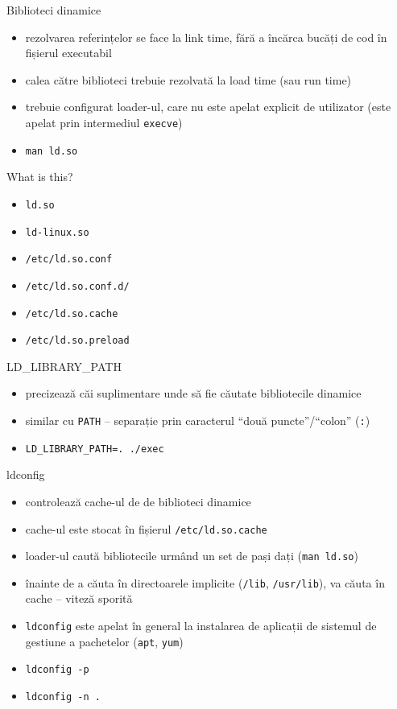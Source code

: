 \documentclass{simple}
\begin{document}
\begin{frame}{Biblioteci dinamice}
  \begin{itemize}
    \item rezolvarea referințelor se face la link time, fără a încărca bucăți
    de cod în fișierul executabil
    \item calea către biblioteci trebuie rezolvată la load time (sau run time)
    \item trebuie configurat loader-ul, care nu este apelat explicit de
    utilizator (este apelat prin intermediul \texttt{execve})
    \item \texttt{man ld.so}
  \end{itemize}
\end{frame}

\begin{frame}{What is this?}
  \begin{itemize}
    \item \texttt{ld.so}
    \item \texttt{ld-linux.so}
    \item \texttt{/etc/ld.so.conf}
    \item \texttt{/etc/ld.so.conf.d/}
    \item \texttt{/etc/ld.so.cache}
    \item \texttt{/etc/ld.so.preload}
  \end{itemize}
\end{frame}

\begin{frame}{LD\_LIBRARY\_PATH}
  \begin{itemize}
    \item precizează căi suplimentare unde să fie căutate bibliotecile
    dinamice
    \item similar cu \texttt{PATH} -- separație prin caracterul ``două
    puncte''/``colon'' (\texttt{:})
    \item \texttt{LD\_LIBRARY\_PATH=. ./exec}
  \end{itemize}
\end{frame}

\begin{frame}{ldconfig}
  \begin{itemize}
    \item controlează cache-ul de de biblioteci dinamice
    \item cache-ul este stocat în fișierul \texttt{/etc/ld.so.cache}
    \item loader-ul caută bibliotecile urmând un set de pași dați (\texttt{man
    ld.so})
    \item înainte de a căuta în directoarele implicite (\texttt{/lib},
    \texttt{/usr/lib}), va căuta în cache -- viteză sporită
    \item \texttt{ldconfig} este apelat în general la instalarea de aplicații
    de sistemul de gestiune a pachetelor (\texttt{apt}, \texttt{yum})
    \item \texttt{ldconfig -p}
    \item \texttt{ldconfig -n .}
  \end{itemize}
\end{frame}
\end{document}
